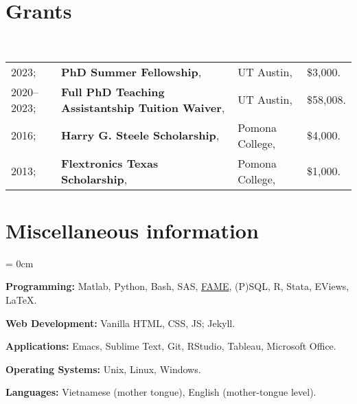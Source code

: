 \documentclass[a4paper, 10pt]{article}
\begin{document}
  \section{Grants}
  ~\begin{tabular}{llll}
    2023; & \textbf{PhD Summer Fellowship}, & UT Austin, & \$3,000.\\
    2020--2023; & \textbf{Full PhD Teaching Assistantship Tuition Waiver}, & UT Austin, & \$58,008.\\
    2016; & \textbf{Harry G. Steele Scholarship}, & Pomona College, & \$4,000.\\
    2013; & \textbf{Flextronics Texas Scholarship}, & Pomona College, & \$1,000.
  \end{tabular}
  \vspace*{0.25em}
    
  \section{Miscellaneous information}
  \begin{compactitem}\parskip = 0cm
    \item \textbf{Programming:} Matlab, Python, Bash, SAS, \href{https://en.wikipedia.org/wiki/FAME_(database)}{FAME}, (P)SQL, R, Stata, EViews, \LaTeX.
    \item \textbf{Web Development:} Vanilla HTML, CSS, JS; Jekyll.
    \item \textbf{Applications:} Emacs, Sublime Text, Git, RStudio, Tableau, Microsoft Office.
    \item \textbf{Operating Systems:} Unix, Linux, Windows.
    \item \textbf{Languages:} Vietnamese (mother tongue), English (mother-tongue level).
  \end{compactitem}
\end{document}

